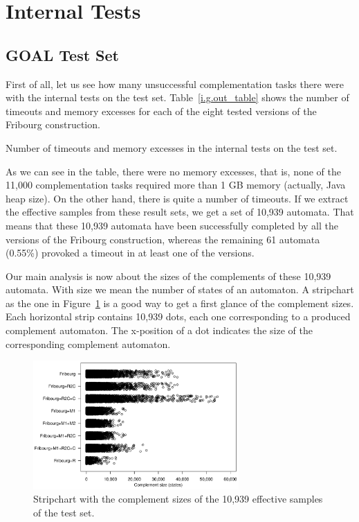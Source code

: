 \section{Internal Tests}

\subsection{GOAL Test Set}
First of all, let us see how many unsuccessful complementation tasks there were with the internal tests on the \goal{} test set. Table~\ref{i.g.out_table} shows the number of timeouts and memory excesses for each of the eight tested versions of the Fribourg construction.

\begin{table}[ht]
\centering

\caption{Number of timeouts and memory excesses in the internal tests on the \goal{} test set.}
\label{i.g.out_table}
\end{table}

As we can see in the table, there were no memory excesses, that is, none of the 11,000 complementation tasks required more than 1 GB memory (actually, Java heap size). On the other hand, there is quite a number of timeouts. If we extract the effective samples from these result sets, we get a set of 10,939 automata. That means that these 10,939 automata have been successfully completed by all the versions of the Fribourg construction, whereas the remaining 61 automata (0.55\%) provoked a timeout in at least one of the versions.

Our main analysis is now about the sizes of the complements of these 10,939 automata. With size we mean the number of states of an automaton. A stripchart as the one in Figure~\ref{i.g.stripchart} is a good way to get a first glance of the complement sizes. Each horizontal strip contains 10,939 dots, each one corresponding to a produced complement automaton. The x-position of a dot indicates the size of the corresponding complement automaton.

\begin{figure}[ht]
\centering
\includegraphics[width=0.7\textwidth]{figures/r/internal/goal/s.stripchart.pdf}
\caption{Stripchart with the complement sizes of the 10,939 effective samples of the \goal{} test set.}
\label{i.g.stripchart}
\end{figure}

